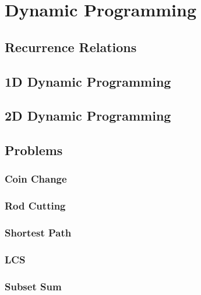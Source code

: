 \chapter{Dynamic Programming}

\section{Recurrence Relations}

\section{1D Dynamic Programming}

\section{2D Dynamic Programming}

\section{Problems}
\subsection{Coin Change}

\subsection{Rod Cutting}

\subsection{Shortest Path}

\subsection{LCS}

\subsection{Subset Sum}